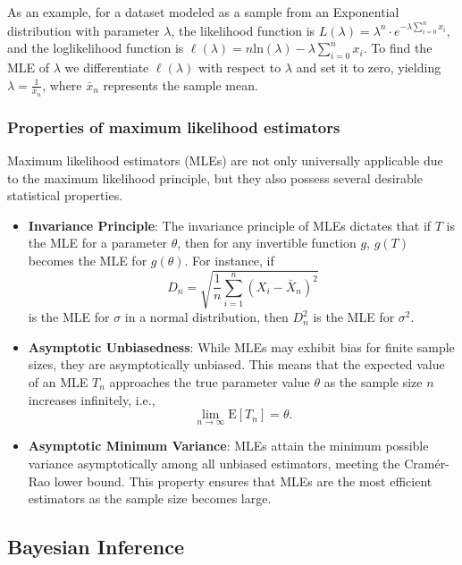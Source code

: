 \documentclass{article}
\begin{document}
As an example, for a dataset modeled as a sample from an Exponential distribution with parameter $\lambda$, the likelihood function is $L(\lambda)=\lambda^n \cdot e^{-\lambda \sum_{i=0}^{n} x_i}$, and the loglikelihood function is $\ell (\lambda)=n \text{ln}(\lambda)-\lambda \sum_{i=0}^{n} x_i$. To find the MLE of $\lambda$ we differentiate $\ell (\lambda)$ with respect to $\lambda$ and set it to zero, yielding $\lambda = \frac {1} {\bar{x}_n}$, where $\bar{x}_n$ represents the sample mean.

\subsubsection{Properties of maximum likelihood estimators}

Maximum likelihood estimators (MLEs) are not only universally applicable due to the maximum likelihood principle, but they also possess several desirable statistical properties.

\begin{itemize}
    \item \textbf{Invariance Principle}: The invariance principle of MLEs dictates that if \(T\) is the MLE for a parameter \(\theta\), then for any invertible function \(g\), \(g(T)\) becomes the MLE for \(g(\theta)\). For instance, if 
\[
D_{n} = \sqrt{\frac{1}{n} \sum_{i=1}^{n}(X_{i} - \bar{X}_{n})^2}
\]
is the MLE for \(\sigma\) in a normal distribution, then \(D_{n}^2\) is the MLE for \(\sigma^2\).

    \item \textbf{Asymptotic Unbiasedness}: While MLEs may exhibit bias for finite sample sizes, they are asymptotically unbiased. This means that the expected value of an MLE \(T_n\) approaches the true parameter value \(\theta\) as the sample size \(n\) increases infinitely, i.e.,
\[
\lim_{n \rightarrow \infty} \mathrm{E}[T_{n}] = \theta.
\]

    \item \textbf{Asymptotic Minimum Variance}: MLEs attain the minimum possible variance asymptotically among all unbiased estimators, meeting the Cramér-Rao lower bound. This property ensures that MLEs are the most efficient estimators as the sample size becomes large.
\end{itemize}

\subsection{Bayesian Inference}
\end{document}
